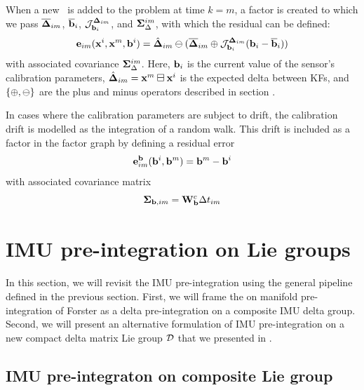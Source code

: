 When a new \keyframe\ is added to the problem at time $k=m$,
a factor is created to which we pass $\overline{{{\bm \Delta}}}_{im}$, $\overline{{\bf b}}_i$,  ${\mathcal{J}^{{{\bm \Delta}}_{im}}_{{\bf b}_i}}$, and ${\bm \Sigma}_\Delta^{im}$, with which the residual can be defined:
%
%
\begin{align}
    {\bf e}_{im}({\bf x}^i, {\bf x}^m, {\bf b}^i) = \hat{{{\bm \Delta}}}_{im} \ominus (\overline{{{\bm \Delta}}}_{im} \oplus {\mathcal{J}^{{{\bm \Delta}}_{im}}_{{\bf b}_i}}({\bf b}_i-\overline{{\bf b}}_i) )  
    \label{eq:preint_residual}
\end{align}
%
with associated covariance ${\bm \Sigma}_\Delta^{im}$.
Here, ${\bf b}_i$ is the current  value of the sensor's calibration parameters,  $\hat{{{\bm \Delta}}}_{im}={\bf x}^m\boxminus{\bf x}^i$ is the expected delta between KFs, and $\{\oplus,\ominus\}$ are the 
 plus and minus operators described in section . 

In cases where the calibration parameters are subject to drift, the calibration drift is modelled as the integration of a random walk. This drift is included as a factor in the factor graph by defining a residual error
%
\begin{equation}
    {\bf e}^{{\bf b}}_{im}({\bf b}^i, {\bf b}^m) = {\bf b}^m - {\bf b}^i
\end{equation}
%
with associated covariance matrix
%
\begin{equation}
    {\bm \Sigma}_{{\bf b},im} = {\bf W}^c_{{\bf b}} \Delta t_{im}
\end{equation}


%
%
%
%
\section{IMU pre-integration on Lie groups}
In this section, we will revisit the IMU pre-integration using the general pipeline defined in the previous section. First, we will frame the on manifold pre-integration
of Forster \cite{forster2015imu, forster2017-TRO} as a delta pre-integration on a composite IMU delta group.
Second, we will present an alternative formulation of IMU pre-integration on a new compact delta matrix Lie group $\mathcal{D}$ that we presented in \cite{fourmy2019absolute}.

\subsection{IMU pre-integraton on composite Lie group}
\label{sec:imu_preint_composite}

